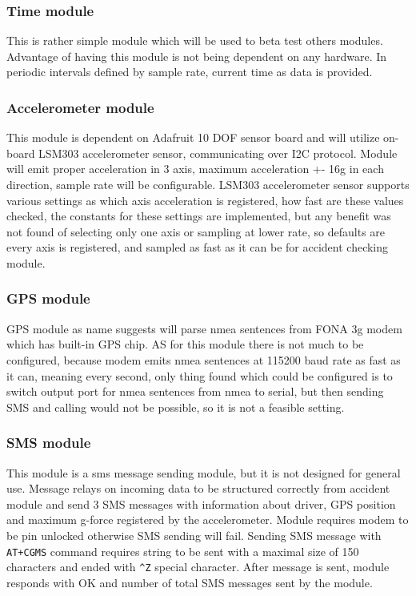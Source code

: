 \subsubsection{Time module} %
\label{ssub:time_module}
This is rather simple module which will be used to beta test others modules. Advantage of having this module is not being dependent on any hardware. In periodic intervals defined by sample rate, current time as data is provided.
\subsubsection{Accelerometer module} %
This module is dependent on Adafruit 10 DOF sensor board and will utilize on-board LSM303 accelerometer sensor, communicating over I2C protocol. Module will emit proper acceleration in 3 axis, maximum acceleration +- 16g in each direction, sample rate will be configurable. LSM303 accelerometer sensor supports various settings as which axis acceleration is registered, how fast are these values checked, the constants for these settings are implemented, but any benefit was not found of selecting only one axis or sampling at lower rate, so defaults are every axis is registered, and sampled as fast as it can be for accident checking module.
\label{ssub:accelerometer_module}
\subsubsection{GPS module} %
\label{ssub:gps_module}
GPS module as name suggests will parse nmea sentences from FONA 3g modem which has built-in GPS chip. AS for this module there is not much to be configured, because modem emits nmea sentences at 115200 baud rate as fast as it can, meaning every second, only thing found which could be configured is to switch output port for nmea sentences from nmea to serial, but then sending SMS and calling would not be possible, so it is not a feasible setting.
\subsubsection{SMS module} %
\label{ssub:sms_module}
This module is a sms message sending module, but it is not designed for general use. Message relays on incoming data to be structured correctly from accident module and send 3 SMS messages with information about driver, GPS position and maximum g-force registered by the accelerometer. Module requires modem to be pin unlocked otherwise SMS sending will fail. Sending SMS message with \verb|AT+CGMS| command requires string to be sent with a maximal size of 150 characters and ended with \verb|^Z| special character. After message is sent, module responds with OK and number of total SMS messages sent by the module.
